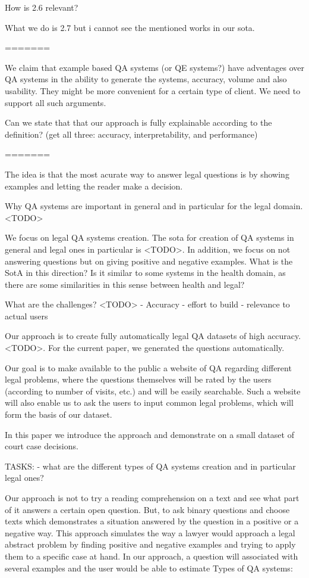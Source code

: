 \documentclass{IOS-Book-Article}
\begin{document}
How is 2.6 relevant?

What we do is 2.7 but i cannot see the mentioned works in our sota.

=======

We claim that example based QA systems (or QE systems?) have adventages over QA systems in the ability to generate the systems, accuracy, volume and also usability. They might be more convenient for a certain type of client. We need to support all such arguments.

Can we state that that our approach is fully explainable according to the definition? (get all three: accuracy, interpretability, and performance)

=======


The idea is that the most acurate way to answer legal questions is by showing examples and letting the reader make a decision.

Why QA systems are important in general and in particular for the legal domain. <TODO>

We focus on legal QA systems creation. The sota for creation of QA systems in general and legal ones in particular is <TODO>. In addition, we focus on not answering questions but on giving positive and negative examples. What is the SotA in this direction? Is it similar to some systems in the health domain, as there are some similarities in this sense between health and legal?

What are the challenges? <TODO>
- Accuracy
- effort to build
- relevance to actual users

Our approach is to create fully automatically legal QA datasets of high accuracy.<TODO>. For the current paper, we generated the questions automatically.

Our goal is to make available to the public a website of QA regarding different legal problems, where the questions themselves will be rated by the users (according to number of visits, etc.) and will be easily searchable. Such a website will also enable us to ask the users to input common legal problems, which will form the basis of our dataset.

In this paper we introduce the approach and demonstrate on a small dataset of court case decisions. 

TASKS:
- what are the different types of QA systems creation and in particular legal ones?

Our approach is not to try a reading comprehension on a text and see what part of it answers a certain open question. But, to ask binary questions and choose texts which demonstrates a situation answered by the question in a positive or a negative way. This approach simulates the way a lawyer would approach a legal abstract problem by finding positive and negative examples and trying to apply them to a specific case at hand. In our approach, a question will associated with several examples and the user would be able to estimate  
Types of QA systems:
\end{document}
